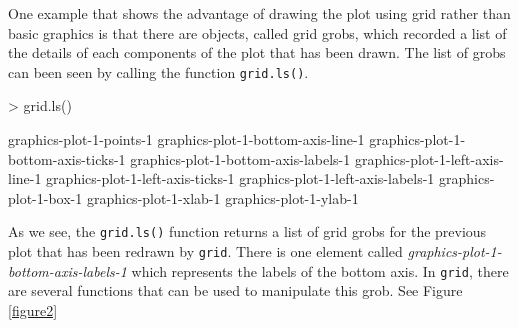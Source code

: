 \documentclass[paper=a4, fontsize=11pt]{report}
\begin{document}
One example that shows the advantage of drawing the plot using grid rather than basic graphics is that there are objects, called grid grobs, which recorded a list of the details of each components of the plot that has been drawn. The list of grobs can been seen by calling the function \texttt{grid.ls()}. \\
\begin{Schunk}
\begin{Sinput}
> grid.ls()
\end{Sinput}
\begin{Soutput}
graphics-plot-1-points-1
graphics-plot-1-bottom-axis-line-1
graphics-plot-1-bottom-axis-ticks-1
graphics-plot-1-bottom-axis-labels-1
graphics-plot-1-left-axis-line-1
graphics-plot-1-left-axis-ticks-1
graphics-plot-1-left-axis-labels-1
graphics-plot-1-box-1
graphics-plot-1-xlab-1
graphics-plot-1-ylab-1
\end{Soutput}
\end{Schunk}


As we see, the \texttt{grid.ls()} function returns a list of grid grobs for the previous plot that has been redrawn by \texttt{grid}. There is one element called \textit{graphics-plot-1-bottom-axis-labels-1} which represents the labels of the bottom axis. In \texttt{grid}, there are several functions that can be used to manipulate this grob. See Figure \ref{figure2} \\
\end{document}
